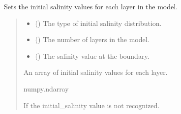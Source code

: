 \documentclass[a4paper,11pt,english,openany]{sphinxmanual}
\begin{document}
\begin{fulllineitems}
\label{\detokenize{api/spyice.preprocess.initial_boundary_conditions:src.spyice.preprocess.initial_boundary_conditions.set_inital_salinity}}
\pysigstartsignatures
\pysiglinewithargsret
{}
{\sphinxparamcomma {}\sphinxparamcomma {}}
{}
\pysigstopsignatures
\sphinxAtStartPar
Sets the initial salinity values for each layer in the model.
\begin{quote}\begin{description}
\begin{itemize}
\item {} 
\sphinxAtStartPar
{} () \textendash{} The type of initial salinity distribution.

\item {} 
\sphinxAtStartPar
{} () \textendash{} The number of layers in the model.

\item {} 
\sphinxAtStartPar
{} () \textendash{} The salinity value at the boundary.

\end{itemize}

\sphinxAtStartPar
An array of initial salinity values for each layer.

\sphinxAtStartPar
numpy.ndarray

\sphinxAtStartPar
{} \textendash{} If the initial\_salinity value is not recognized.

\end{description}\end{quote}

\end{fulllineitems}

\end{document}
